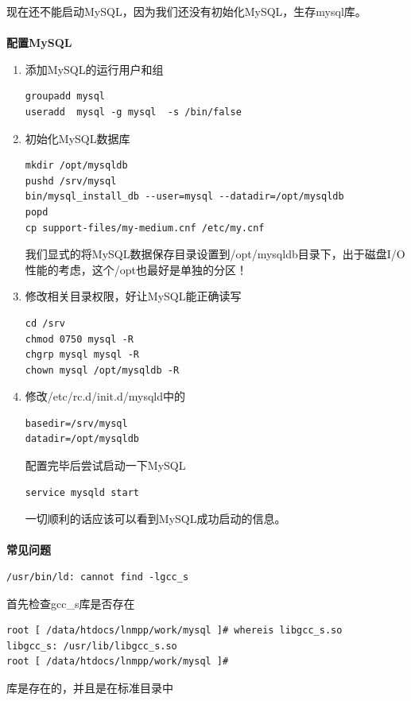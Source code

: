 \documentclass{article}
\begin{document}
现在还不能启动MySQL，因为我们还没有初始化MySQL，生存mysql库。

\paragraph{}\textbf{配置MySQL}\\

\begin{enumerate}
\item 添加MySQL的运行用户和组
\begin{verbatim}
groupadd mysql
useradd  mysql -g mysql  -s /bin/false
\end{verbatim}
\item 初始化MySQL数据库
\begin{verbatim}
mkdir /opt/mysqldb
pushd /srv/mysql
bin/mysql_install_db --user=mysql --datadir=/opt/mysqldb
popd
cp support-files/my-medium.cnf /etc/my.cnf
\end{verbatim}
我们显式的将MySQL数据保存目录设置到/opt/mysqldb目录下，出于磁盘I/O性能的考虑，这个/opt也最好是单独的分区！

\item 修改相关目录权限，好让MySQL能正确读写
\begin{verbatim}
cd /srv
chmod 0750 mysql -R
chgrp mysql mysql -R
chown mysql /opt/mysqldb -R
\end{verbatim}
\item 修改/etc/rc.d/init.d/mysqld中的
\begin{verbatim}
basedir=/srv/mysql
datadir=/opt/mysqldb
\end{verbatim}

配置完毕后尝试启动一下MySQL
\begin{verbatim}
service mysqld start
\end{verbatim}
一切顺利的话应该可以看到MySQL成功启动的信息。
\end{enumerate}

\paragraph{}\textbf{常见问题}\\

\begin{verbatim}
/usr/bin/ld: cannot find -lgcc_s
\end{verbatim}
首先检查gcc\_s库是否存在

\begin{verbatim}
root [ /data/htdocs/lnmpp/work/mysql ]# whereis libgcc_s.so
libgcc_s: /usr/lib/libgcc_s.so
root [ /data/htdocs/lnmpp/work/mysql ]# 
\end{verbatim}
库是存在的，并且是在标准目录中
\end{document}
